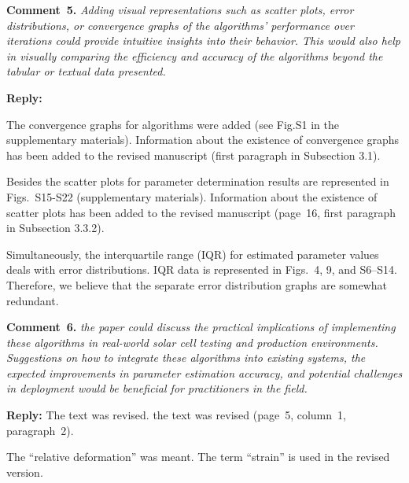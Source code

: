 \documentclass[a4paper,fleqn]{cas-sc}
\begin{document}
\vspace{1cm}
\noindent
\textcolor[rgb]{0.00,0.50,1.00}{\textbf{Comment~5.}}
\emph{ Adding visual representations such as scatter plots, error distributions,
or convergence graphs of the algorithms' performance over iterations could provide intuitive insights into their behavior.
This would also help in visually comparing the efficiency and accuracy of the algorithms beyond the tabular or textual data presented.}

\noindent
\textcolor[rgb]{0.51,0.00,0.00}{\textbf{Reply:}}

The convergence graphs for  algorithms were added (see Fig.S1 in the supplementary materials).
Information about the existence of convergence graphs has been added to the revised manuscript (first paragraph in Subsection 3.1).

Besides the scatter plots for parameter determination results are represented in Figs.~S15-S22 (supplementary materials).
Information about the existence of scatter plots has been added to the revised manuscript (page~16, first paragraph in Subsection 3.3.2).

Simultaneously, the interquartile range (IQR) for estimated parameter values deals with error distributions.
IQR data is represented in Figs.~4, 9, and S6--S14.
Therefore, we believe that the separate error distribution graphs are somewhat redundant.


\vspace{1cm}
\noindent
\textcolor[rgb]{0.00,0.50,1.00}{\textbf{Comment~6.}}
\emph{ the paper could discuss the practical implications of implementing these algorithms
in real-world solar cell testing and production environments.
Suggestions on how to integrate these algorithms into existing systems, the expected improvements
in parameter estimation accuracy, and potential challenges in deployment would be beneficial for practitioners in the field.}

\noindent
\textcolor[rgb]{0.51,0.00,0.00}{\textbf{Reply:}}
The text was revised.
the text was revised (page~5, column~1, paragraph~2).

The ``relative deformation'' was meant.
The term ``strain'' is used in the revised version.



\end{document}
